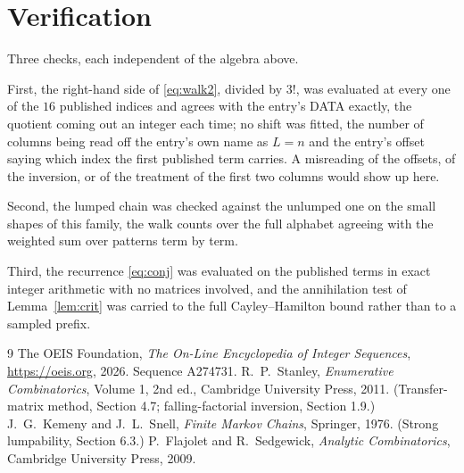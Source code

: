 \documentclass[11pt,a4paper]{article}
\theoremstyle{plain}
\theoremstyle{definition}
\begin{document}
\section{Verification}

Three checks, each independent of the algebra above.

First, the right-hand side of \eqref{eq:walk2}, divided by $3!$, was evaluated at every
one of the $16$ published indices and agrees with the entry's DATA exactly, the quotient
coming out an integer each time; no shift was fitted, the number of columns being read off the
entry's own name as $L=n$ and the entry's offset saying which index the first published
term carries. A misreading of the offsets, of the inversion, or of the treatment of the first
two columns would show up here.

Second, the lumped chain was checked against the unlumped one on the small shapes of this
family, the walk counts over the full alphabet agreeing with the weighted sum over patterns
term by term.

Third, the recurrence \eqref{eq:conj} was evaluated on the published terms in exact integer
arithmetic with no matrices involved, and the annihilation test of Lemma~\ref{lem:crit} was
carried to the full Cayley--Hamilton bound rather than to a sampled prefix.

\begin{thebibliography}{9}
 The OEIS Foundation, \emph{The On-Line Encyclopedia of Integer
Sequences}, \url{https://oeis.org}, 2026. Sequence A274731.
 R.~P.~Stanley, \emph{Enumerative Combinatorics}, Volume 1, 2nd ed.,
Cambridge University Press, 2011. (Transfer-matrix method, Section 4.7; falling-factorial
inversion, Section 1.9.)
 J.~G.~Kemeny and J.~L.~Snell, \emph{Finite Markov Chains}, Springer,
1976. (Strong lumpability, Section 6.3.)
 P.~Flajolet and R.~Sedgewick, \emph{Analytic Combinatorics}, Cambridge
University Press, 2009.
\end{thebibliography}
\end{document}
